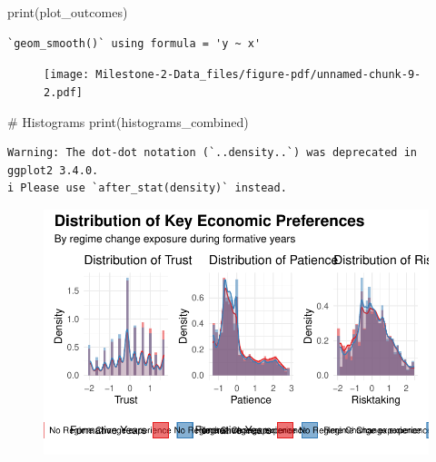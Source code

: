\documentclass[
  letterpaper,
  DIV=11,
  numbers=noendperiod]{scrartcl}
\newenvironment{Shaded}{\begin{snugshade}}{\end{snugshade}}
\newcommand{\CommentTok}[1]{\textcolor[rgb]{0.37,0.37,0.37}{#1}}
\newcommand{\FunctionTok}[1]{\textcolor[rgb]{0.28,0.35,0.67}{#1}}
\newcommand{\NormalTok}[1]{\textcolor[rgb]{0.00,0.23,0.31}{#1}}
\begin{document}
\begin{Shaded}
\begin{Highlighting}[]
\FunctionTok{print}\NormalTok{(plot\_outcomes)}
\end{Highlighting}
\end{Shaded}

\begin{verbatim}
`geom_smooth()` using formula = 'y ~ x'
\end{verbatim}

\begin{figure}[H]

{\centering \texttt{[image: Milestone-2-Data\_files/figure-pdf/unnamed-chunk-9-2.pdf]}

}

\end{figure}

\begin{Shaded}
\begin{Highlighting}[]
\CommentTok{\# Histograms}
\FunctionTok{print}\NormalTok{(histograms\_combined)}
\end{Highlighting}
\end{Shaded}

\begin{verbatim}
Warning: The dot-dot notation (`..density..`) was deprecated in ggplot2 3.4.0.
i Please use `after_stat(density)` instead.
\end{verbatim}

\begin{figure}[H]

{\centering \includegraphics{Milestone-2-Data_files/figure-pdf/unnamed-chunk-9-3.pdf}

}

\end{figure}
\end{document}
